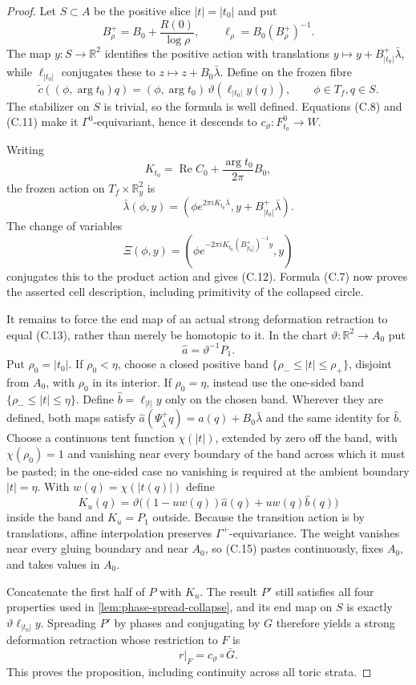 \begin{proof}
Let $S\subset A$ be the positive slice $|t|=|t_0|$ and put
\[
 B_\rho^+=B_0+\frac{R(0)}{\log\rho},\qquad
 \ell_\rho=B_0(B_\rho^+)^{-1}.
\]
The map $y:S\to\mathbb R^2$ identifies the positive action with translations
$y\mapsto y+B_{|t_0|}^+\bar\lambda$, while $\ell_{|t_0|}$ conjugates these to
$z\mapsto z+B_0\bar\lambda$.  Define on the frozen fibre
\[
 \widetilde c((\phi,\arg t_0)q)=
 (\phi,\arg t_0)\,
 \vartheta(\ell_{|t_0|}y(q)),\qquad \phi\in T_f, q\in S.
\tag{C.13}
\]
The stabilizer on $S$ is trivial, so the formula is well defined.  Equations
(C.8) and (C.11) make it $\Gamma^0$-equivariant, hence it descends to
$c_\vartheta:F_{t_0}^0\to W$.

Writing
\[
 K_{t_0}=\operatorname{Re}C_0+\frac{\arg t_0}{2\pi}B_0,
\]
the frozen action on $T_f\times\mathbb R_y^2$ is
\[
 \bar\lambda(\phi,y)=
 (\phi e^{2\pi iK_{t_0}\bar\lambda},
  y+B_{|t_0|}^+\bar\lambda).
\]
The change of variables
\[
 \Xi(\phi,y)=
 (\phi e^{-2\pi iK_{t_0}(B_{|t_0|}^+)^{-1}y},y)
\tag{C.14}
\]
conjugates this to the product action and gives (C.12).  Formula (C.7) now
proves the asserted cell description, including primitivity of the collapsed
circle.

It remains to force the end map of an actual strong deformation retraction to
equal (C.13), rather than merely be homotopic to it.  In the chart
$\vartheta:\mathbb R^2\to A_0$ put
\[
 \widehat a=\vartheta^{-1}P_1.
\]
Put $\rho_0=|t_0|$.  If $\rho_0<\eta$, choose a closed positive band
$\{\rho_-\leq |t|\leq\rho_+\}$, disjoint from $A_0$, with $\rho_0$ in its
interior.  If $\rho_0=\eta$, instead use the one-sided band
$\{\rho_-\leq |t|\leq\eta\}$.  Define
$\widehat b=\ell_{|t|}y$ only on the chosen band.  Wherever they are defined,
both maps satisfy
$\widehat a(\Psi^+_{\bar\lambda}q)=\widehat a(q)+B_0\bar\lambda$ and the same
identity for $\widehat b$.  Choose a continuous tent function $\chi(|t|)$,
extended by zero off the band, with $\chi(\rho_0)=1$ and vanishing near every
boundary of the band across which it must be pasted; in the one-sided case no
vanishing is required at the ambient boundary $|t|=\eta$.  With
$w(q)=\chi(|t(q)|)$ define
\[
 K_u(q)=\vartheta\bigl((1-uw(q))\widehat a(q)
                         +uw(q)\widehat b(q)\bigr)
\tag{C.15}
\]
inside the band and $K_u=P_1$ outside.  Because the transition action is by
translations, affine interpolation preserves $\Gamma^+$-equivariance.  The
weight vanishes near every gluing boundary and near $A_0$, so (C.15) pastes
continuously, fixes $A_0$, and takes values in $A_0$.

Concatenate the first half of $P$ with $K_u$.  The result $P'$ still satisfies
all four properties used in \cref{lem:phase-spread-collapse}, and its end map
on $S$ is exactly $\vartheta\ell_{|t_0|}y$.  Spreading $P'$ by phases and
conjugating by $G$ therefore yields a strong deformation retraction whose
restriction to $F$ is
\[
 r|_F=c_\vartheta\circ\bar G.
\]
This proves the proposition, including continuity across all toric strata.
\end{proof}

